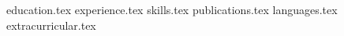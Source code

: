 \documentclass[letterpaper,11pt]{article}
\begin{document}


{education.tex}
{experience.tex}
{skills.tex}
{publications.tex}
{languages.tex}
{extracurricular.tex}
\end{document}

